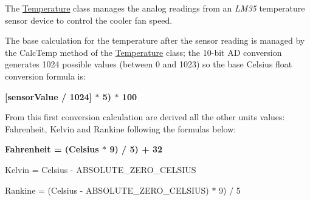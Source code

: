 The {\ttfamily \hyperlink{class_temperature}{Temperature}} class manages the analog readings from an {\itshape L\-M35} temperature sensor device to control the cooler fan speed.

\par
The base calculation for the temperature after the sensor reading is managed by the {\ttfamily Calc\-Temp} method of the \hyperlink{class_temperature}{Temperature} class; the 10-\/bit A\-D conversion generates 1024 possible values (between 0 and 1023) so the base Celsius float conversion formula is\-:\par
 \begin{center}{\bfseries \mbox{[}sensor\-Value / 1024\mbox{]} $\ast$ 5) $\ast$ 100 }\end{center} 

From this first conversion calculation are derived all the other units values\-: Fahrenheit, Kelvin and Rankine following the formulas below\-:\par
 \begin{center}{\bfseries  Fahrenheit = (Celsius $\ast$ 9) / 5) + 32\par
 Kelvin = Celsius -\/ A\-B\-S\-O\-L\-U\-T\-E\-\_\-\-Z\-E\-R\-O\-\_\-\-C\-E\-L\-S\-I\-U\-S\par
 Rankine = (Celsius -\/ A\-B\-S\-O\-L\-U\-T\-E\-\_\-\-Z\-E\-R\-O\-\_\-\-C\-E\-L\-S\-I\-U\-S) $\ast$ 9) / 5\par
 }\end{center}  